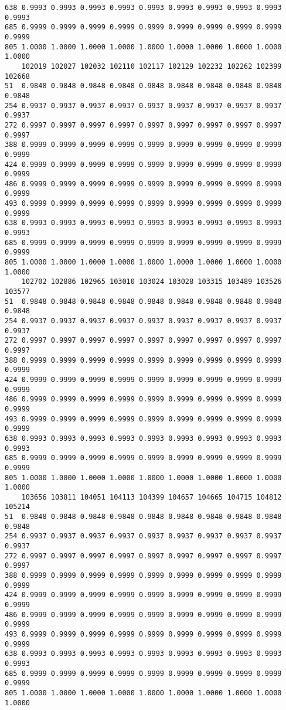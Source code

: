 \documentclass[
]{report}
\begin{document}
\begin{verbatim}
638 0.9993 0.9993 0.9993 0.9993 0.9993 0.9993 0.9993 0.9993 0.9993 0.9993
685 0.9999 0.9999 0.9999 0.9999 0.9999 0.9999 0.9999 0.9999 0.9999 0.9999
805 1.0000 1.0000 1.0000 1.0000 1.0000 1.0000 1.0000 1.0000 1.0000 1.0000
    102019 102027 102032 102110 102117 102129 102232 102262 102399 102668
51  0.9848 0.9848 0.9848 0.9848 0.9848 0.9848 0.9848 0.9848 0.9848 0.9848
254 0.9937 0.9937 0.9937 0.9937 0.9937 0.9937 0.9937 0.9937 0.9937 0.9937
272 0.9997 0.9997 0.9997 0.9997 0.9997 0.9997 0.9997 0.9997 0.9997 0.9997
388 0.9999 0.9999 0.9999 0.9999 0.9999 0.9999 0.9999 0.9999 0.9999 0.9999
424 0.9999 0.9999 0.9999 0.9999 0.9999 0.9999 0.9999 0.9999 0.9999 0.9999
486 0.9999 0.9999 0.9999 0.9999 0.9999 0.9999 0.9999 0.9999 0.9999 0.9999
493 0.9999 0.9999 0.9999 0.9999 0.9999 0.9999 0.9999 0.9999 0.9999 0.9999
638 0.9993 0.9993 0.9993 0.9993 0.9993 0.9993 0.9993 0.9993 0.9993 0.9993
685 0.9999 0.9999 0.9999 0.9999 0.9999 0.9999 0.9999 0.9999 0.9999 0.9999
805 1.0000 1.0000 1.0000 1.0000 1.0000 1.0000 1.0000 1.0000 1.0000 1.0000
    102702 102886 102965 103010 103024 103028 103315 103489 103526 103577
51  0.9848 0.9848 0.9848 0.9848 0.9848 0.9848 0.9848 0.9848 0.9848 0.9848
254 0.9937 0.9937 0.9937 0.9937 0.9937 0.9937 0.9937 0.9937 0.9937 0.9937
272 0.9997 0.9997 0.9997 0.9997 0.9997 0.9997 0.9997 0.9997 0.9997 0.9997
388 0.9999 0.9999 0.9999 0.9999 0.9999 0.9999 0.9999 0.9999 0.9999 0.9999
424 0.9999 0.9999 0.9999 0.9999 0.9999 0.9999 0.9999 0.9999 0.9999 0.9999
486 0.9999 0.9999 0.9999 0.9999 0.9999 0.9999 0.9999 0.9999 0.9999 0.9999
493 0.9999 0.9999 0.9999 0.9999 0.9999 0.9999 0.9999 0.9999 0.9999 0.9999
638 0.9993 0.9993 0.9993 0.9993 0.9993 0.9993 0.9993 0.9993 0.9993 0.9993
685 0.9999 0.9999 0.9999 0.9999 0.9999 0.9999 0.9999 0.9999 0.9999 0.9999
805 1.0000 1.0000 1.0000 1.0000 1.0000 1.0000 1.0000 1.0000 1.0000 1.0000
    103656 103811 104051 104113 104399 104657 104665 104715 104812 105214
51  0.9848 0.9848 0.9848 0.9848 0.9848 0.9848 0.9848 0.9848 0.9848 0.9848
254 0.9937 0.9937 0.9937 0.9937 0.9937 0.9937 0.9937 0.9937 0.9937 0.9937
272 0.9997 0.9997 0.9997 0.9997 0.9997 0.9997 0.9997 0.9997 0.9997 0.9997
388 0.9999 0.9999 0.9999 0.9999 0.9999 0.9999 0.9999 0.9999 0.9999 0.9999
424 0.9999 0.9999 0.9999 0.9999 0.9999 0.9999 0.9999 0.9999 0.9999 0.9999
486 0.9999 0.9999 0.9999 0.9999 0.9999 0.9999 0.9999 0.9999 0.9999 0.9999
493 0.9999 0.9999 0.9999 0.9999 0.9999 0.9999 0.9999 0.9999 0.9999 0.9999
638 0.9993 0.9993 0.9993 0.9993 0.9993 0.9993 0.9993 0.9993 0.9993 0.9993
685 0.9999 0.9999 0.9999 0.9999 0.9999 0.9999 0.9999 0.9999 0.9999 0.9999
805 1.0000 1.0000 1.0000 1.0000 1.0000 1.0000 1.0000 1.0000 1.0000 1.0000

\end{verbatim}
\end{document}
